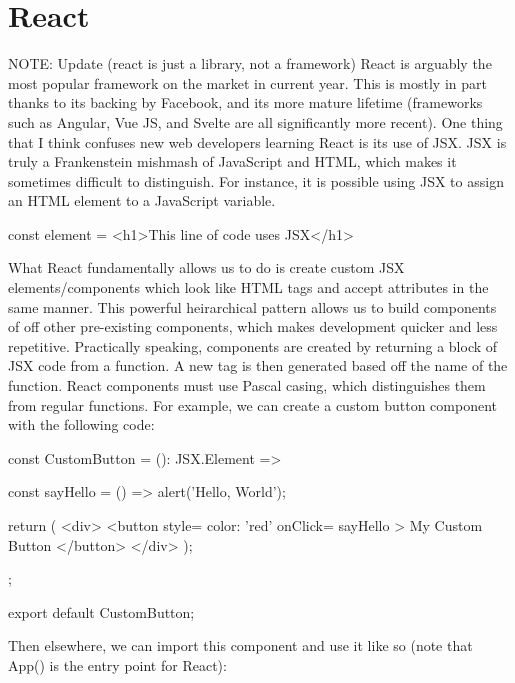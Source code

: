 \documentclass{article}
\begin{document}
\section{React}

NOTE: Update (react is just a library, not a framework)
React is arguably the most popular framework on the market in current year. This is mostly in part thanks to
its backing by Facebook, and its more mature lifetime (frameworks such as Angular, Vue JS, and Svelte are all
significantly more recent). One thing that I think confuses new web developers learning React is its use of
JSX. JSX is truly a Frankenstein mishmash of JavaScript and HTML, which makes it sometimes difficult to
distinguish. For instance, it is possible using JSX to assign an HTML element to a JavaScript variable.

\begin{tslst}

const element = <h1>This line of code uses JSX</h1>

\end{tslst}

What React fundamentally allows us to do is create custom JSX elements/components which look like HTML tags
and accept attributes in the same manner. This powerful heirarchical pattern allows us to build components of
off other pre-existing components, which makes development quicker and less repetitive. Practically speaking,
components are created by returning a block of JSX code from a function. A new tag is then generated based off
the name of the function. React components must use Pascal casing, which distinguishes them from regular
functions. For example, we can create a custom button component with the following code:

\begin{tslst}

const CustomButton = (): JSX.Element => {
    const sayHello = () => {
        alert('Hello, World');
    }

    return (
        <div>
            <button
                style={ color: 'red' }
                onClick={ sayHello }>
                My Custom Button
            </button>
        </div>
    );
};

export default CustomButton;

\end{tslst}

Then elsewhere, we can import this component and use it like so (note that App() is the entry point for
React):
\end{document}
